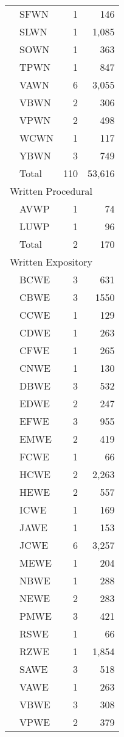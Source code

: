 \begin{longtable}{llrr}
		& SFWN & 1 & 146\\
		& SLWN & 1 & 1,085\\
		& SOWN & 1 & 363\\
		& TPWN & 1 & 847\\
		& VAWN & 6 & 3,055\\
		& VBWN & 2 & 306\\
		& VPWN & 2 & 498\\
		& WCWN & 1 & 117\\
		& YBWN & 3 & 749\\\addlinespace
		& Total  & 110 &  53,616\\\midrule
		\multicolumn{4}{l}{Written Procedural}\\
		& AVWP & 1 & 74\\
		& LUWP & 1 & 96\\\addlinespace
		&  Total & 2 &  170\\\midrule
		\multicolumn{4}{l}{Written Expository}\\
		& BCWE & 3 & 631\\
		& CBWE & 3 & 1550\\
		& CCWE & 1 & 129\\
		& CDWE & 1 & 263\\
		& CFWE & 1 & 265\\
		& CNWE & 1 & 130\\
		& DBWE & 3 & 532\\
		& EDWE & 2 & 247\\
		& EFWE & 3 & 955\\
		& EMWE & 2 & 419\\
		& FCWE & 1 & 66\\
		& HCWE & 2 & 2,263\\
		& HEWE & 2 & 557\\
		& ICWE & 1 & 169\\
		& JAWE & 1 & 153\\
		& JCWE & 6 & 3,257\\
		& MEWE & 1 & 204\\
		& NBWE & 1 & 288\\
		& NEWE & 2 & 283\\
		& PMWE & 3 & 421\\
		& RSWE & 1 & 66\\
		& RZWE & 1 & 1,854\\
		& SAWE & 3 & 518\\
		& VAWE & 1 & 263\\
		& VBWE & 3 & 308\\
		& VPWE & 2 & 379\\

\end{longtable}
